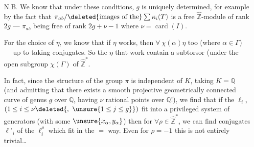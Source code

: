 \uline{N.B.} We know that under these conditions, \(g\) is uniquely determined,
for example by the fact that
\(\pi_{ab}/\deleted{\text{images of the}}\sum\kappa_i(T)\)
is a free \(\widehat{\mathbb Z}\)-module of rank \(2g\) --- \(\pi_{ab}\)
being free of rank \(2g+\nu-1\) where \(\nu=\operatorname{card}(I)\).

For the choice of \(\eta\), we know that if \(\eta\) works, then
\(\forall\ \chi(\alpha)\eta\) too (where \(\alpha\in\Gamma\)) --- up to taking
conjugates. So the \(\eta\) that work  contain
a subtorsor (under the open subgroup
\(\chi(\Gamma)\) of \(\widehat{\mathbb Z}^{*}\).





In fact, since the structure of the group \(\pi\) is independent of \(K\),
taking \(K=\mathbb Q\) (and admitting that there exists a smooth projective
geometrically connected curve of genus \(g\) over \(\mathbb Q\), having \(\nu\) rational points over \(\mathbb Q\)!),
we find that if the \(\ell_i\), 
\((1\leq i\leq\nu\deleted{,\ \unsure{1\leq j\leq g}})\)
 fit into a privileged system of generators
(with some \(\unsure{x_\alpha,y_\alpha}\)) then for
\(\forall\rho\in\widehat{\mathbb Z}^{*}\), we can find conjugates
\(\ell'_i\) of the \(\ell_i^\rho\) which fit in the \(=\) way.
Even for \(\rho=-1\) this is not entirely trivial\ldots


